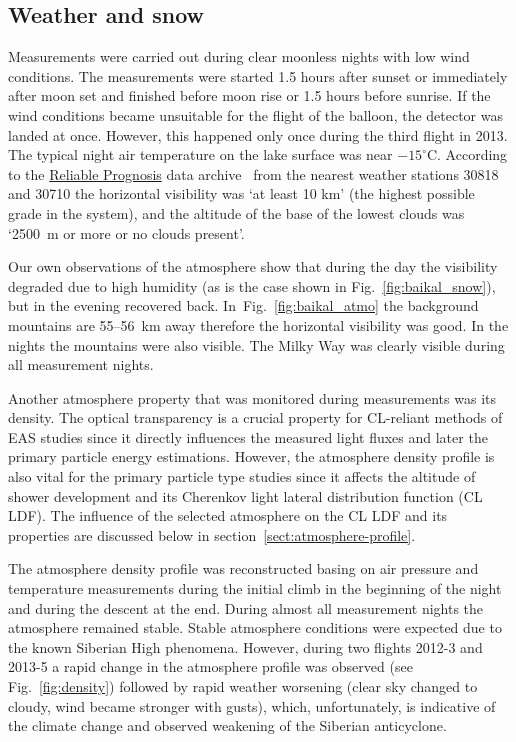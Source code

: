 \documentclass[preprint,5p,times]{elsarticle}
\begin{document}

\subsection{Weather and snow}

Measurements were carried out during clear moonless nights with low wind conditions. The measurements were started 1.5 hours after sunset or immediately after moon set and finished before moon rise or 1.5 hours before sunrise. If the wind conditions became unsuitable for the flight of the balloon, the detector was landed at once. However, this happened only once during the third flight in 2013. The typical night air temperature on the lake surface was near $-15^\circ$C. According to the \href{https://rp5.ru/Weather_in_the_world}{Reliable Prognosis} data archive~\cite{rp5} from the nearest weather stations 30818 and 30710 the horizontal visibility was `at least 10 km' (the highest possible grade in the system), and the altitude of the base of the lowest clouds was `2500~m or more or no clouds present'.

Our own observations of the atmosphere show that during the day the visibility degraded due to high humidity (as is the case shown in Fig.~\ref{fig:baikal_snow}), but in the evening recovered back. In~Fig.~\ref{fig:baikal_atmo} the background mountains are 55--56~km away therefore the horizontal visibility was good. In the nights the mountains were also visible. The Milky Way was clearly visible during all measurement nights. 

Another atmosphere property that was monitored during measurements was its density. The optical transparency is a crucial property for CL-reliant methods of EAS studies since it directly influences the measured light fluxes and later the primary particle energy estimations. However, the atmosphere density profile is also vital for the primary particle type studies since it affects the altitude of shower development and its Cherenkov light lateral distribution function (CL LDF). The influence of the selected atmosphere on the CL LDF and its properties are discussed below in section~\ref{sect:atmosphere-profile}.

The atmosphere density profile was reconstructed basing on air pressure and temperature measurements during the initial climb in the beginning of the night and during the descent at the end. During almost all measurement nights the atmosphere remained stable. Stable atmosphere conditions were expected due to the known Siberian High phenomena. However, during two flights 2012-3 and 2013-5 a rapid change in the atmosphere profile was observed (see Fig.~\ref{fig:density}) followed by rapid weather worsening (clear sky changed to cloudy, wind became stronger with gusts), which, unfortunately, is indicative of the climate change and observed weakening of the Siberian anticyclone. 
\end{document}
